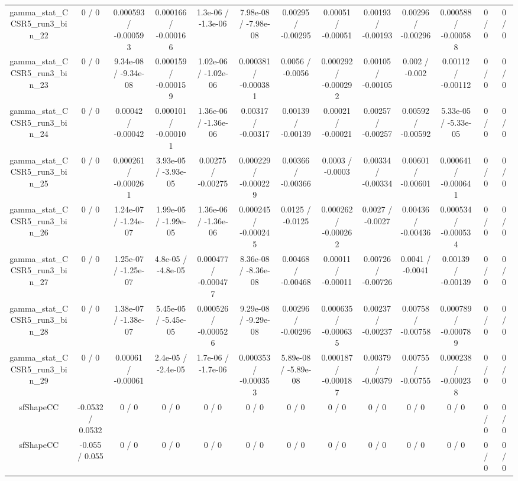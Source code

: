 \documentclass[10pt]{article}
\begin{document}
\begin{table}[htbp]
\begin{center}
\begin{tabular}{|c|c|c|c|c|c|c|c|c|c|c|c|c|}
  gamma_stat_CCSR5_run3_bin_22 & 0 / 0 & 0.000593 / -0.000593 & 0.000166 / -0.000166 & 1.3e-06 / -1.3e-06 & 7.98e-08 / -7.98e-08 & 0.00295 / -0.00295 & 0.00051 / -0.00051 & 0.00193 / -0.00193 & 0.00296 / -0.00296 & 0.000588 / -0.000588 & 0 / 0 & 0 / 0 \\ 
  gamma_stat_CCSR5_run3_bin_23 & 0 / 0 & 9.34e-08 / -9.34e-08 & 0.000159 / -0.000159 & 1.02e-06 / -1.02e-06 & 0.000381 / -0.000381 & 0.0056 / -0.0056 & 0.000292 / -0.000292 & 0.00105 / -0.00105 & 0.002 / -0.002 & 0.00112 / -0.00112 & 0 / 0 & 0 / 0 \\ 
  gamma_stat_CCSR5_run3_bin_24 & 0 / 0 & 0.00042 / -0.00042 & 0.000101 / -0.000101 & 1.36e-06 / -1.36e-06 & 0.00317 / -0.00317 & 0.00139 / -0.00139 & 0.00021 / -0.00021 & 0.00257 / -0.00257 & 0.00592 / -0.00592 & 5.33e-05 / -5.33e-05 & 0 / 0 & 0 / 0 \\ 
  gamma_stat_CCSR5_run3_bin_25 & 0 / 0 & 0.000261 / -0.000261 & 3.93e-05 / -3.93e-05 & 0.00275 / -0.00275 & 0.000229 / -0.000229 & 0.00366 / -0.00366 & 0.0003 / -0.0003 & 0.00334 / -0.00334 & 0.00601 / -0.00601 & 0.000641 / -0.000641 & 0 / 0 & 0 / 0 \\ 
  gamma_stat_CCSR5_run3_bin_26 & 0 / 0 & 1.24e-07 / -1.24e-07 & 1.99e-05 / -1.99e-05 & 1.36e-06 / -1.36e-06 & 0.000245 / -0.000245 & 0.0125 / -0.0125 & 0.000262 / -0.000262 & 0.0027 / -0.0027 & 0.00436 / -0.00436 & 0.000534 / -0.000534 & 0 / 0 & 0 / 0 \\ 
  gamma_stat_CCSR5_run3_bin_27 & 0 / 0 & 1.25e-07 / -1.25e-07 & 4.8e-05 / -4.8e-05 & 0.000477 / -0.000477 & 8.36e-08 / -8.36e-08 & 0.00468 / -0.00468 & 0.00011 / -0.00011 & 0.00726 / -0.00726 & 0.0041 / -0.0041 & 0.00139 / -0.00139 & 0 / 0 & 0 / 0 \\ 
  gamma_stat_CCSR5_run3_bin_28 & 0 / 0 & 1.38e-07 / -1.38e-07 & 5.45e-05 / -5.45e-05 & 0.000526 / -0.000526 & 9.29e-08 / -9.29e-08 & 0.00296 / -0.00296 & 0.000635 / -0.000635 & 0.00237 / -0.00237 & 0.00758 / -0.00758 & 0.000789 / -0.000789 & 0 / 0 & 0 / 0 \\ 
  gamma_stat_CCSR5_run3_bin_29 & 0 / 0 & 0.00061 / -0.00061 & 2.4e-05 / -2.4e-05 & 1.7e-06 / -1.7e-06 & 0.000353 / -0.000353 & 5.89e-08 / -5.89e-08 & 0.000187 / -0.000187 & 0.00379 / -0.00379 & 0.00755 / -0.00755 & 0.000238 / -0.000238 & 0 / 0 & 0 / 0 \\ 
  sfShapeCC & -0.0532 / 0.0532 & 0 / 0 & 0 / 0 & 0 / 0 & 0 / 0 & 0 / 0 & 0 / 0 & 0 / 0 & 0 / 0 & 0 / 0 & 0 / 0 & 0 / 0 \\ 
  sfShapeCC & -0.055 / 0.055 & 0 / 0 & 0 / 0 & 0 / 0 & 0 / 0 & 0 / 0 & 0 / 0 & 0 / 0 & 0 / 0 & 0 / 0 & 0 / 0 & 0 / 0 \\ 

\end{tabular}
\end{center}
\end{table}
\end{document}
